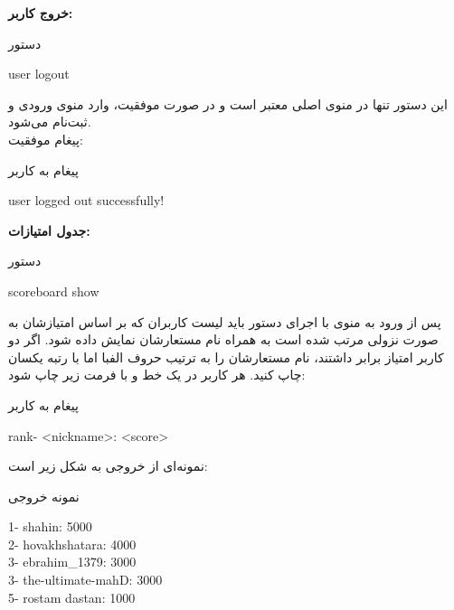 \documentclass[]{article}
\begin{document}
\vspace{.5cm}
\textbf{خروج کاربر:}
\begin{mybox}[colback=yellow]{دستور}
	\begin{latin}	
		user logout
	\end{latin}
\end{mybox}
این دستور تنها در منوی اصلی معتبر است و در صورت موفقیت، وارد منوی ورودی و 
ثبت‌نام می‌شود.
\\
پیغام موفقیت:
\begin{mybox}[colback=yellow]{پیغام به کاربر}
	\begin{latin}	
		user logged out successfully!
	\end{latin}
\end{mybox}

\vspace{.5cm}
\textbf{جدول امتیازات:}
\begin{mybox}[colback=yellow]{دستور}
	\begin{latin}	
		scoreboard show
	\end{latin}
\end{mybox}
پس از ورود به منوی  با اجرای دستور باید لیست کاربران که بر 
اساس امتیازشان به صورت نزولی مرتب شده است به همراه نام مستعارشان نمایش داده 
شود. اگر دو کاربر امتیاز برابر داشتند، نام مستعارشان را به ترتیب حروف الفبا 
اما با رتبه یکسان چاپ کنید. هر کاربر در یک خط و با فرمت زیر چاپ شود:
\begin{mybox}[colback=yellow]{پیغام به کاربر}
	\begin{latin}	
		rank- <nickname>: <score>
	\end{latin}
\end{mybox}
نمونه‌ای از خروجی به شکل زیر است:
\begin{mybox}[colback=yellow]{نمونه خروجی}
	\begin{latin}	
		1- shahin: 5000 \\
		2- hovakhshatara: 4000 \\
		3- ebrahim\_1379: 3000 \\
		3- the-ultimate-mahD: 3000 \\
		5- rostam dastan: 1000
	\end{latin}
\end{mybox}
\end{document}

